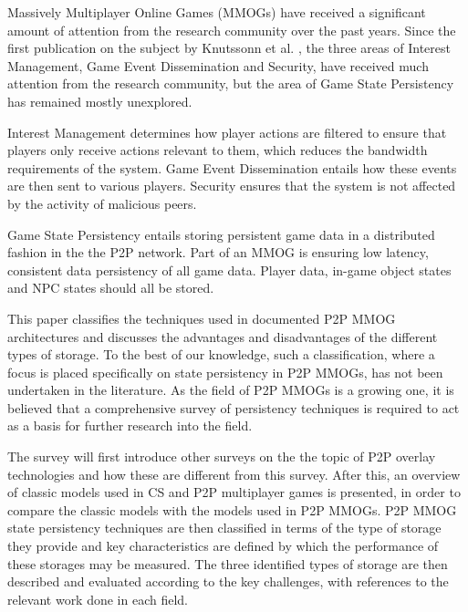 \documentclass[10pt,a4paper,journal,cspaper,compsoc]{IEEEtran}
\begin{document}
%
%
%
%
 Massively Multiplayer Online Games (MMOGs) have received a significant amount of attention from the research
community over the past years. Since the first publication on the subject by Knutssonn et al. \cite{knutsson_p2p_first}, the three areas of Interest
Management, Game Event Dissemination and Security, have received much attention from the research community, but the area of Game State Persistency
has remained mostly unexplored.

Interest Management determines how player actions are filtered to ensure that players only receive actions relevant to them, which reduces the
bandwidth requirements of the system. Game Event Dissemination entails how these events are then sent to various players. Security ensures that the
system is not affected by the activity of malicious peers.

Game State Persistency entails storing persistent game data in a distributed fashion in the the P2P network. Part of an MMOG is ensuring low latency,
consistent data persistency of all game data. Player data, in-game object states and \ac{NPC} states should all be stored.

This paper classifies the techniques used in documented P2P MMOG architectures and discusses the advantages and disadvantages of the different types
of storage. To the best of our knowledge, such a classification, where a focus is placed specifically on state persistency in P2P MMOGs, has not been
undertaken in the literature. As the field of P2P MMOGs is a growing one, it is believed that a comprehensive survey of persistency techniques is
required to act as a basis for further research into the field.

The survey will first introduce other surveys on the the topic of P2P overlay technologies and how these are different from this survey. After this,
an overview of classic models used in \ac{CS} and P2P multiplayer games is presented, in order to compare the classic models with the models used in
P2P MMOGs. P2P MMOG state persistency techniques are then classified in terms of the type of storage they provide and key characteristics are defined
by which the performance of these storages may be measured. The three identified types of storage are then described and evaluated according to the
key challenges, with references to the relevant work done in each field.
\end{document}
